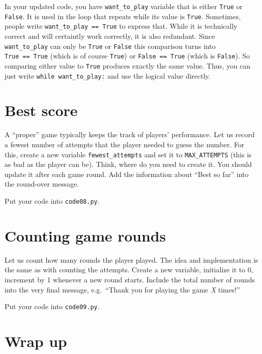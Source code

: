 \documentclass[
]{book}
\begin{document}
In your updated code, you have \texttt{want\_to\_play} variable that is either \texttt{True} or \texttt{False}. It is used in the loop that repeats while its value is \texttt{True}. Sometimes, people write \texttt{want\_to\_play\ ==\ True} to express that. While it is technically correct and will certaintly work correctly, it is also redundant. Since \texttt{want\_to\_play} can only be \texttt{True} or \texttt{False} this comparison turns into \texttt{True\ ==\ True} (which is of course \texttt{True}) or \texttt{False\ ==\ True} (which is \texttt{False}). So comparing either value to \texttt{True} produces exactly the same value. Thus, you can just write \texttt{while\ want\_to\_play:} and use the logical value directly.

\hypertarget{best-score}{%
\section{Best score}\label{best-score}}

A ``proper'' game typically keeps the track of players' performance. Let us record a fewest number of attempts that the player needed to guess the number. For this, create a new variable \texttt{fewest\_attempts} and set it to \texttt{MAX\_ATTEMPTS} (this is as bad as the player can be). Think, where do you need to create it. You should update it after each game round. Add the information about ``Best so far'' into the round-over message.

Put your code into \texttt{code08.py}.

\hypertarget{counting-game-rounds}{%
\section{Counting game rounds}\label{counting-game-rounds}}

Let us count how many rounds the player played. The idea and implementation is the same as with counting the attempts. Create a new variable, initialize it to 0, increment by 1 whenever a new round starts. Include the total number of rounds into the very final message, e.g.~``Thank you for playing the game \emph{X} times!''

Put your code into \texttt{code09.py}.

\hypertarget{wrap-up}{%
\section{Wrap up}\label{wrap-up}}
\end{document}
